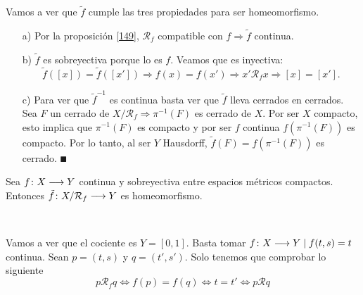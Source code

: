 \documentclass[GTS.tex]{subfiles}
\begin{document}
\begin{dem}
Vamos a ver que $\tilde{f}$ cumple las tres propiedades para ser homeomorfismo.
\begin{enumerate}
\item[a)] Por la proposición \ref{149}, $\mathcal{R}_f$ compatible con $f\Rightarrow\tilde{f}$ continua.
\item[b)] $\tilde{f}$ es sobreyectiva porque lo es $f$. Veamos que es inyectiva:
\begin{equation*}
\tilde{f}([x])=\tilde{f}([x'])\Rightarrow f(x)=f(x')\Rightarrow x'\mathcal{R}_f x\Rightarrow [x]=[x'].
\end{equation*}
\item[c)] Para ver que $\tilde{f}^{-1}$ es continua basta ver que $\tilde{f}$ lleva cerrados en cerrados. Sea $F$ un cerrado de $X/\mathcal{R}_f\Rightarrow\pi^{-1}(F)$ es cerrado de $X$. Por ser $X$ compacto, esto implica que $\pi^{-1}(F)$ es compacto y por ser $f$ continua $f(\pi^{-1}(F))$ es compacto. Por lo tanto, al ser $Y$ Hausdorff, $\tilde{f}(F)=f(\pi^{-1}(F))$ es cerrado. $\QED$
\end{enumerate}

\end{dem}

\begin{coro} Sea $f\colon{X}\longrightarrow{Y}$ continua y sobreyectiva entre espacios métricos compactos. Entonces $\tilde{f}\colon{X/\mathcal{R}_f}\longrightarrow{Y}$ es homeomorfismo.
\end{coro}

\begin{ej}\


Vamos a ver que el cociente es $Y=[0,1]$. Basta tomar $f\colon{X}\longrightarrow{Y}\mid f(t,s)=t$ continua. Sean $p=(t,s)$ y $q=(t',s')$. Solo tenemos que comprobar lo siguiente
\[
p\mathcal{R}_f q\Leftrightarrow f(p)=f(q)\Leftrightarrow t=t'\Leftrightarrow p\mathcal{R}q
\]
\end{ej}
\end{document}

